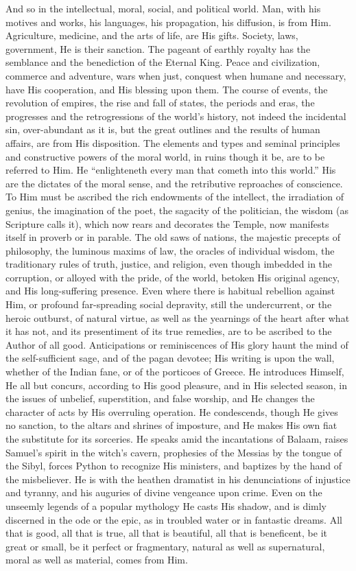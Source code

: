 And so in the intellectual, moral, social, and political world.
Man, with his motives and works, his languages, his propagation, his
diffusion, is from Him. Agriculture, medicine, and the arts of life,
are His gifts. Society, laws, government, He is their sanction. The
pageant of earthly royalty has the semblance and the benediction of
the Eternal King. Peace and civilization, commerce and adventure, wars
when just, conquest when humane and necessary, have His cooperation,
and His blessing upon them. The course of events, the revolution of
empires, the rise and fall of states, the periods and eras, the
progresses and the retrogressions of the world's history, not
indeed the incidental sin, over-abundant as it is, but the great
outlines and the results of human affairs, are from His disposition.
The elements and types and seminal principles and constructive powers
of the moral world, in ruins though it be, are to be referred to Him.
He ``enlighteneth every man that cometh into this world.'' His
are the dictates of the moral sense, and the retributive reproaches of
conscience. To Him must be ascribed the rich endowments of the
intellect, the irradiation of genius, the imagination of the poet, the
sagacity of the politician, the wisdom (as Scripture calls it), which
now rears and decorates the Temple, now manifests itself in proverb or
in parable. The old saws of nations, the majestic precepts of
philosophy, the luminous maxims of law, the oracles of individual
wisdom, the traditionary rules of truth, justice, and religion, even
though imbedded in the corruption, or alloyed with the pride, of the
world, betoken His original agency, and His long-suffering presence.
Even where there is habitual rebellion against Him, or profound
far-spreading social depravity, still the undercurrent, or the heroic
outburst, of natural virtue, as well as the yearnings of the heart
after what it has not, and its presentiment of its true remedies, are
to be ascribed to the Author of all good. Anticipations or
reminiscences of His glory haunt the mind of the self-sufficient sage,
and of the pagan devotee; His writing is upon the wall, whether of the
Indian fane, or of the porticoes of Greece. He introduces Himself, He
all but concurs, according to His good pleasure, and in His selected
season, in the issues of unbelief, superstition, and false worship,
and He changes the character of acts by His overruling operation. He
condescends, though He gives no sanction, to the altars and shrines of
imposture, and He makes His own fiat the substitute for its
sorceries. He speaks amid the incantations of Balaam, raises Samuel's
spirit in the witch's cavern, prophesies of the Messias by the tongue
of the Sibyl, forces Python to recognize His ministers, and baptizes
by the hand of the misbeliever. He is with the heathen dramatist in
his denunciations of injustice and tyranny, and his auguries of divine
vengeance upon crime. Even on the unseemly legends of a popular
mythology He casts His shadow, and is dimly discerned in the ode or
the epic, as in troubled water or in fantastic dreams. All that is
good, all that is true, all that is beautiful, all that is beneficent,
be it great or small, be it perfect or fragmentary, natural as well as
supernatural, moral as well as material, comes from Him.

